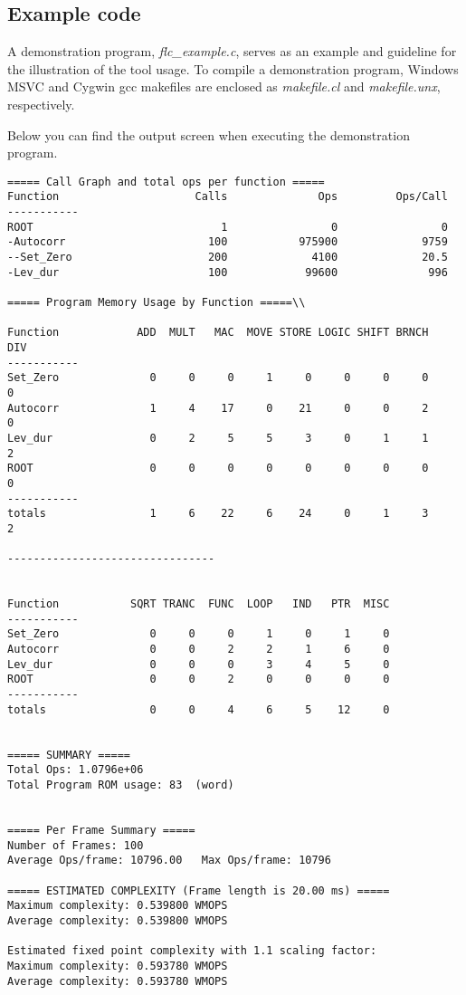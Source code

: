 \subsection{Example code}
A demonstration program, \textit{flc\_example.c}, serves as an example
and guideline for the illustration of the tool usage. To compile a
demonstration program, Windows MSVC and Cygwin gcc makefiles are
enclosed as \textit{makefile.cl} and \textit{makefile.unx},
respectively.

Below you can find the output screen when executing the demonstration program.
\begin{verbatim}
===== Call Graph and total ops per function =====
Function                     Calls              Ops         Ops/Call 
-----------
ROOT                             1                0                0
-Autocorr                      100           975900             9759
--Set_Zero                     200             4100             20.5
-Lev_dur                       100            99600              996

===== Program Memory Usage by Function =====\\

Function            ADD  MULT   MAC  MOVE STORE LOGIC SHIFT BRNCH   DIV
-----------
Set_Zero              0     0     0     1     0     0     0     0     0
Autocorr              1     4    17     0    21     0     0     2     0
Lev_dur               0     2     5     5     3     0     1     1     2
ROOT                  0     0     0     0     0     0     0     0     0
-----------
totals                1     6    22     6    24     0     1     3     2

--------------------------------


Function           SQRT TRANC  FUNC  LOOP   IND   PTR  MISC
-----------
Set_Zero              0     0     0     1     0     1     0
Autocorr              0     0     2     2     1     6     0
Lev_dur               0     0     0     3     4     5     0
ROOT                  0     0     2     0     0     0     0
-----------
totals                0     0     4     6     5    12     0


===== SUMMARY =====
Total Ops: 1.0796e+06
Total Program ROM usage: 83  (word)


===== Per Frame Summary =====
Number of Frames: 100
Average Ops/frame: 10796.00   Max Ops/frame: 10796

===== ESTIMATED COMPLEXITY (Frame length is 20.00 ms) =====
Maximum complexity: 0.539800 WMOPS
Average complexity: 0.539800 WMOPS

Estimated fixed point complexity with 1.1 scaling factor:
Maximum complexity: 0.593780 WMOPS
Average complexity: 0.593780 WMOPS

\end{verbatim}

